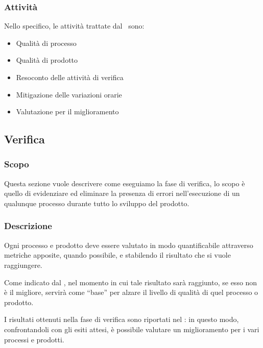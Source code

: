 		

		\subsubsection{Attività}	\label{AttivitaPDQ}
		Nello specifico, le attività trattate dal \PdQd\ sono:
		\begin{itemize}
			\item Qualità di processo
			\item Qualità di prodotto
			\item Resoconto delle attività di verifica
			\item Mitigazione delle variazioni orarie
			\item Valutazione per il miglioramento
		\end{itemize}



	\subsection{Verifica}\label{Verifica}

		\subsubsection{Scopo}
		Questa sezione vuole descrivere come eseguiamo la fase di verifica, lo scopo è quello di evidenziare
		ed eliminare la presenza di errori nell’esecuzione di un qualunque processo durante tutto lo sviluppo del prodotto.


		\subsubsection{Descrizione}
		Ogni processo e prodotto deve essere valutato in modo quantificabile attraverso metriche apposite, quando possibile, e stabilendo il risultato che si vuole
		raggiungere.

		Come indicato dal , nel momento in cui tale risultato sarà raggiunto, se esso non è il migliore,
		servirà come ``base'' per alzare il livello di qualità di quel processo o prodotto.

		I risultati ottenuti nella fase di verifica sono riportati nel \PdQd: in questo modo, confrontandoli con gli esiti attesi,
		è possibile valutare un miglioramento per i vari processi e prodotti.

